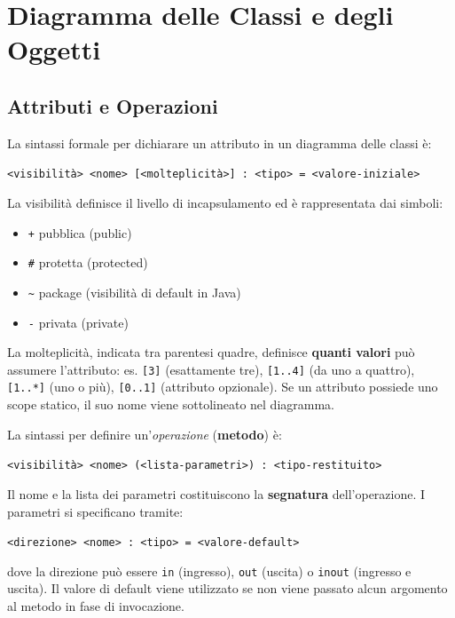 \documentclass[12pt,a4paper,oneside]{book}
\begin{document}
\section{Diagramma delle Classi e degli Oggetti}

\subsection{Attributi e Operazioni}
La sintassi formale per dichiarare un attributo in un diagramma delle classi è: \\
\begin{center}
    \texttt{<visibilità> <nome> [<molteplicità>] : <tipo> = <valore-iniziale>}
\end{center}

La visibilità definisce il livello di incapsulamento ed è rappresentata dai simboli:
\begin{itemize}
    \item \texttt{+} pubblica (public)
    \item \texttt{\#} protetta (protected)
    \item \texttt{\textasciitilde} package (visibilità di default in Java)
    \item \texttt{-} privata (private)
\end{itemize}

La molteplicità, indicata tra parentesi quadre, definisce \textbf{quanti valori} può assumere l'attributo: es. \texttt{[3]} (esattamente tre), \texttt{[1..4]} (da uno a quattro), \texttt{[1..*]} (uno o più), \texttt{[0..1]} (attributo opzionale).
Se un attributo possiede uno scope statico, il suo nome viene sottolineato nel diagramma.

La sintassi per definire un'\textit{operazione} (\textbf{metodo}) è:
\begin{center}
    \texttt{<visibilità> <nome> (<lista-parametri>) : <tipo-restituito>}
\end{center}

Il nome e la lista dei parametri costituiscono la \textbf{segnatura} dell'operazione. I parametri si specificano tramite:
\begin{center}
    \texttt{<direzione> <nome> : <tipo> = <valore-default>}
\end{center}
dove la direzione può essere \texttt{in} (ingresso), \texttt{out} (uscita) o \texttt{inout} (ingresso e uscita). Il valore di default viene utilizzato se non viene passato alcun argomento al metodo in fase di invocazione.
\end{document}
